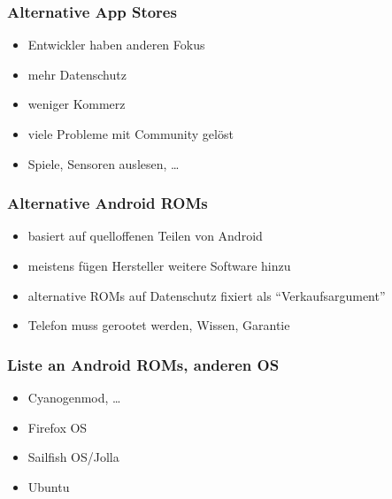 \documentclass[12pt]{beamer}
\begin{document}
\begin{frame}
	\frametitle{Alternative App Stores}
	\begin{itemize}
		\item<2-> Entwickler haben anderen Fokus
		\item<3-> mehr Datenschutz
		\item<4-> weniger Kommerz
		\item<5-> viele Probleme mit Community gelöst
		\item<6-> Spiele, Sensoren auslesen, \ldots
	\end{itemize}
\end{frame}
\begin{frame}
	\frametitle{Alternative Android ROMs}
	\begin{itemize}
		\item<2-> basiert auf quelloffenen Teilen von Android
		\item<3-> meistens fügen Hersteller weitere Software hinzu
		\item<4-> alternative ROMs auf Datenschutz fixiert als "`Verkaufsargument"'
		\item<5-> Telefon muss gerootet werden, Wissen, Garantie
	\end{itemize}
\end{frame}

\begin{frame}
	\frametitle{Liste an Android ROMs, anderen OS}
	\begin{itemize}
		\item<2-> Cyanogenmod, \ldots
		\item<3-> Firefox OS
		\item<4-> Sailfish OS/Jolla
		\item<5-> Ubuntu
	\end{itemize}
\end{frame}
\end{document}
